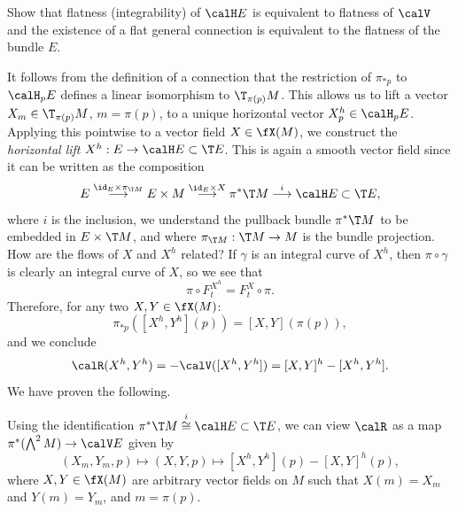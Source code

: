 \begin{xca}
    Show that flatness (integrability) of $\calH E$ is equivalent to flatness of $\calV$ and the existence of a flat general connection is equivalent to the flatness of the bundle $E$.
\end{xca}

It follows from the definition of a connection that the restriction of $\pi_{\ast p}$ to $\calH_pE$ defines a linear isomorphism to $\T_{\pi(p)}M$.
This allows us to lift a vector $X_m\in \T_{\pi(p)}M$, $m=\pi(p)$, to a unique horizontal vector $X_p^h\in \calH_pE$. Applying this pointwise to a vector field $X\in\fX(M)$, we construct the \emph{horizontal lift} $X^h:E\to \calH E\subset \T E$. This is again a smooth vector field since it can be written as the composition
\[E\overset{\id_E\times \pi_{\T M}}{\longrightarrow}E\times M \overset{\id_E\times X}{\longrightarrow}\pi^\ast \T M \overset{i}{\longrightarrow}\calH E\subset \T E,\]
where $i$ is the inclusion, we understand the pullback bundle $\pi^\ast \T M$ to be embedded in $E\times \T M$, and where $\pi_{\T M}:\T M\to M$ is the bundle projection. How are the flows of $X$ and $X^h$ related? If $\gamma$ is an integral curve of $X^h$, then $\pi\circ\gamma$ is clearly an integral curve of $X$, so we see that 
\[\pi\circ F^{X^h}_t=F^{X}_t\circ \pi.\]
Therefore, for any two $X,Y\in \fX(M)$:
\[\pi_{\ast p}([X^h,Y^h](p))=[X,Y](\pi(p)),\]
and we conclude
\[\calR(X^h,Y^h)=-\calV([X^h,Y^h])=[X,Y]^h-[X^h,Y^h].\]
We have proven the following.

\begin{cor}\label{cor curvature in terms of hor}
    Using the identification $\pi^\ast \T M\overset{i}{\cong}\calH E\subset \T E$, we can view $\calR$ as a map $\pi^\ast(\bigwedge^2M)\to \calV E$ given by 
    \[(X_m,Y_m,p)\mapsto (X,Y,p)\mapsto [X^h,Y^h](p)-[X,Y]^h(p),\]
    where $X,Y\in \fX(M)$ are arbitrary vector fields on $M$ such that $X(m)=X_m$ and $Y(m)=Y_m$, and $m=\pi(p)$.
\end{cor}


